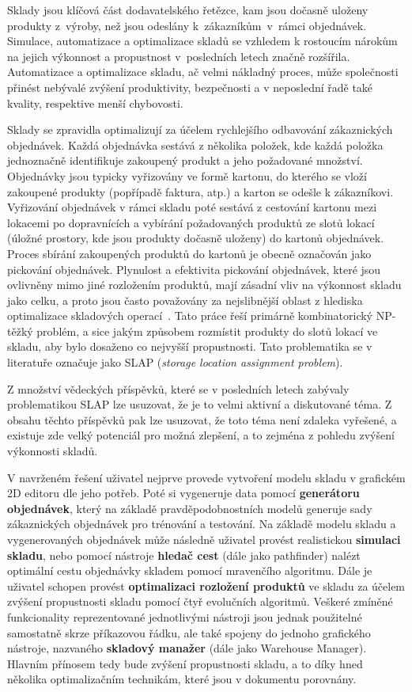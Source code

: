 Sklady jsou klíčová část dodavatelského řetězce, kam jsou dočasně uloženy produkty z~výroby, než jsou odeslány k~zákazníkům~v~rámci objednávek. Simulace, automatizace a optimalizace skladů se vzhledem k rostoucím nárokům na jejich výkonnost a propustnost v~posledních letech značně rozšířila. Automatizace a optimalizace skladu, ač velmi nákladný proces, může společnosti přinést nebývalé zvýšení produktivity, bezpečnosti a v neposlední řadě také kvality, respektive menší chybovosti.

Sklady se zpravidla optimalizují za účelem rychlejšího odbavování zákaznických objednávek. Každá objednávka sestává z několika položek, kde každá položka jednoznačně identifikuje zakoupený produkt a jeho požadované množství. Objednávky jsou typicky vyřizovány ve formě kartonu, do kterého se vloží zakoupené produkty (popřípadě faktura, atp.) a karton se odešle k zákazníkovi. Vyřizování objednávek v rámci skladu poté sestává z cestování kartonu mezi lokacemi po dopravnících a vybírání požadovaných produktů ze slotů lokací (úložné prostory, kde jsou produkty dočasně uloženy) do kartonů objednávek. Proces sbírání zakoupených produktů do kartonů je obecně označován jako pickování objednávek. Plynulost a efektivita pickování objednávek, které jsou ovlivněny mimo jiné rozložením produktů, mají zásadní vliv na výkonnost skladu jako celku, a proto jsou často považovány za nejslibnější oblast z hlediska optimalizace skladových operací~\cite{optimisationOrderPickingGA}. Tato práce řeší primárně kombinatorický NP-těžký problém, a sice jakým způsobem rozmístit produkty do slotů lokací ve skladu, aby bylo dosaženo co nejvyšší propustnosti. Tato problematika se v literatuře označuje jako SLAP (\emph{storage location assignment problem}).

Z množství vědeckých příspěvků, které se v posledních letech zabývaly problematikou SLAP lze usuzovat, že je to velmi aktivní a diskutované téma. Z obsahu těchto příspěvků pak lze usuzovat, že toto téma není zdaleka vyřešené, a existuje zde velký potenciál pro možná zlepšení, a to zejména z pohledu zvýšení výkonnosti skladů.

V navrženém řešení uživatel nejprve provede vytvoření modelu skladu v grafickém 2D editoru dle jeho potřeb. Poté si vygeneruje data pomocí \textbf{generátoru objednávek}, který na základě pravděpodobnostních modelů generuje sady zákaznických objednávek pro trénování a testování. Na základě modelu skladu a vygenerovaných objednávek může následně uživatel provést realistickou \textbf{simulaci skladu}, nebo pomocí nástroje \textbf{hledač cest} (dále jako pathfinder) nalézt optimální cestu objednávky skladem pomocí mravenčího algoritmu. Dále je uživatel schopen provést \textbf{optimalizaci rozložení produktů} ve skladu za účelem zvýšení propustnosti skladu pomocí čtyř evolučních algoritmů. Veškeré zmíněné funkcionality reprezentované jednotlivými nástroji jsou jednak použitelné samostatně skrze příkazovou řádku, ale také spojeny do jednoho grafického nástroje, nazvaného \textbf{skladový manažer} (dále jako Warehouse Manager). Hlavním přínosem tedy bude zvýšení propustnosti skladu, a to díky hned několika optimalizačním technikám, které jsou v dokumentu porovnány.

